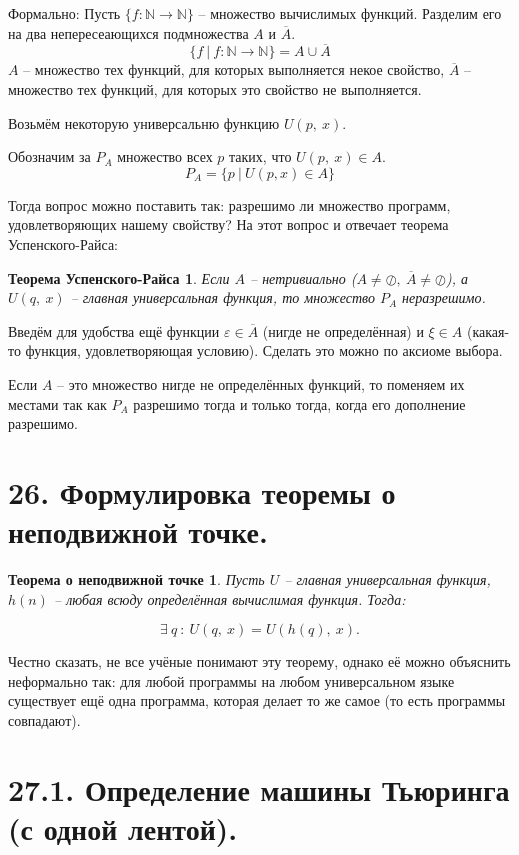 \documentclass[a4paper, 12pt]{article}
\newtheorem*{usp-rais}{Теорема Успенского-Райса}
\newtheorem*{point}{Теорема о неподвижной точке}
\newcommand{\N}{\mathbb{N}}
\begin{document}
Формально:
Пусть $\{f:\N\to\N\}$ -- множество вычислимых функций. 
Разделим его на два непересеающихся подмножества $A$ и $\overline{A}$.
\[
\{f\ |\ f:\N\to\N\} = A \cup \overline{A}
\]
$A$ -- множество тех функций, для которых выполняется некое свойство,
$\overline{A}$ -- множество тех функций, для которых это свойство не выполняется.

Возьмём некоторую универсальню функцию $U(p,\ x)$.

Обозначим за $P_A$ множество всех $p$ таких, что $U(p,\ x) \in A$.
\[
P_A = \{p\ |\ U(p, x) \in A\}
\]

Тогда вопрос можно поставить так: разрешимо ли множество
программ, удовлетворяющих нашему свойству? На этот вопрос и отвечает теорема
Успенского-Райса:
\begin{usp-rais}
   Если $A$ -- нетривиально ($A \neq \oslash,\ \overline{A} \neq \oslash$), а $U(q,\ x)$ -- главная универсальная функция, то множество $P_A$ неразрешимо.
\end{usp-rais}
Введём для удобства ещё функции $\varepsilon \in \overline{A}$ (нигде не 
определённая) и $\xi \in A$ (какая-то функция, удовлетворяющая условию).
Сделать это можно по аксиоме выбора.

Если $A$ -- это множество нигде не определённых функций, то поменяем их
местами так как $P_A$ разрешимо тогда и только тогда, когда его
дополнение разрешимо.

\section*{26. Формулировка теоремы о неподвижной точке.}

\begin{point}
    Пусть $U$ -- главная универсальная функция, $h(n)$ -- любая всюду определённая вычислимая функция. Тогда:
    
    \[
        \exists\ q \ : \ U(q,\ x) = U(h(q),\ x).
    \]
\end{point}

Честно сказать, не все учёные понимают эту теорему, однако её можно объяснить неформально
так: для любой программы на любом универсальном языке существует ещё одна программа,
которая делает то же самое (то есть программы совпадают).

\section*{27.1. Определение машины Тьюринга (с одной лентой).}
\end{document}
